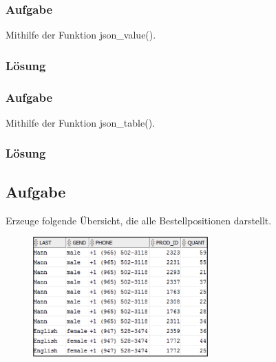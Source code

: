 \subsubsection{Aufgabe}
\label{subsec:uebung_10.aufgabe_01a}
Mithilfe der Funktion json\_value().

\subsubsection*{Lösung}
\label{subsubsec:uebung_10.aufgabe_01a.loesung}


\subsubsection{Aufgabe}
\label{subsec:uebung_10.aufgabe_01b}
Mithilfe der Funktion json\_table().

\subsubsection*{Lösung}
\label{subsubsec:uebung_10.aufgabe_01b.loesung}


\subsection{Aufgabe}
\label{subsec:uebung_10.aufgabe_02}
Erzeuge folgende Übersicht, die alle Bestellpositionen darstellt.

\begin{figure}[H]
  \centering
  \includegraphics[width=0.6\textwidth]{img//uebung_10_-_aufgabe_02.png}
  \label{img:uebung_10_-_aufgabe_02}
\end{figure}

